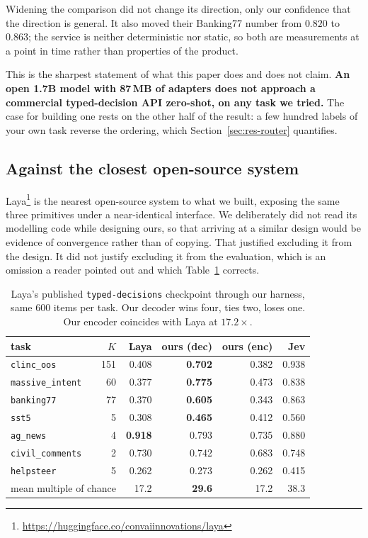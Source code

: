 Widening the comparison did not change its direction, only our confidence
that the direction is general. It also moved their Banking77 number from
$0.820$ to $0.863$; the service is neither deterministic nor static, so
both are measurements at a point in time rather than properties of the
product.

This is the sharpest statement of what this paper does and does not
claim. \textbf{An open 1.7B model with 87\,MB of adapters does not
approach a commercial typed-decision API zero-shot, on any task we
tried.} The case for building one rests on the other half of the result:
a few hundred labels of your own task reverse the ordering, which
Section~\ref{sec:res-router} quantifies.

\subsection{Against the closest open-source system}
\label{sec:res-laya}

Laya\footnote{\url{https://huggingface.co/convaiinnovations/laya}} is the
nearest open-source system to what we built, exposing the same three
primitives under a near-identical interface. We deliberately did not read
its modelling code while designing ours, so that arriving at a similar
design would be evidence of convergence rather than of copying. That
justified excluding it from the design. It did not justify excluding it
from the evaluation, which is an omission a reader pointed out and which
Table~\ref{tab:laya} corrects.

\begin{table}[h]
\centering
\begin{tabular}{lrrrrr}
\toprule
task & $K$ & Laya & ours (dec) & ours (enc) & Jev \\
\midrule
\texttt{clinc\_oos}      & 151 & 0.408 & \textbf{0.702} & 0.382 & 0.938 \\
\texttt{massive\_intent} &  60 & 0.377 & \textbf{0.775} & 0.473 & 0.838 \\
\texttt{banking77}       &  77 & 0.370 & \textbf{0.605} & 0.343 & 0.863 \\
\texttt{sst5}            &   5 & 0.308 & \textbf{0.465} & 0.412 & 0.560 \\
\texttt{ag\_news}        &   4 & \textbf{0.918} & 0.793 & 0.735 & 0.880 \\
\texttt{civil\_comments} &   2 & 0.730 & 0.742 & 0.683 & 0.748 \\
\texttt{helpsteer}       &   5 & 0.262 & 0.273 & 0.262 & 0.415 \\
\midrule
\multicolumn{2}{l}{mean multiple of chance} & 17.2 & \textbf{29.6} & 17.2 & 38.3 \\
\bottomrule
\end{tabular}
\caption{Laya's published \texttt{typed-decisions} checkpoint through our
harness, same 600 items per task. Our decoder wins four, ties two, loses
one. Our encoder coincides with Laya at $17.2\times$.}
\label{tab:laya}
\end{table}

